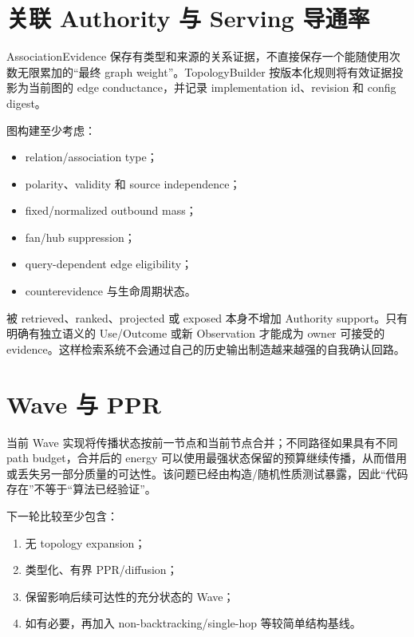 \section{关联 Authority 与 Serving 导通率}

AssociationEvidence 保存有类型和来源的关系证据，不直接保存一个能随使用次数无限累加的“最终 graph weight”。TopologyBuilder 按版本化规则将有效证据投影为当前图的 edge conductance，并记录 implementation id、revision 和 config digest。

图构建至少考虑：

\begin{itemize}
\item relation/association type；
\item polarity、validity 和 source independence；
\item fixed/normalized outbound mass；
\item fan/hub suppression；
\item query-dependent edge eligibility；
\item counterevidence 与生命周期状态。
\end{itemize}

被 retrieved、ranked、projected 或 exposed 本身不增加 Authority support。只有明确有独立语义的 Use/Outcome 或新 Observation 才能成为 owner 可接受的 evidence。这样检索系统不会通过自己的历史输出制造越来越强的自我确认回路。\cite{anderson1983,nous-research-package}

\section{Wave 与 PPR}

当前 Wave 实现将传播状态按前一节点和当前节点合并；不同路径如果具有不同 path budget，合并后的 energy 可以使用最强状态保留的预算继续传播，从而借用或丢失另一部分质量的可达性。该问题已经由构造/随机性质测试暴露，因此“代码存在”不等于“算法已经验证”。\cite{nous-code-snapshot,nous-research-package}

下一轮比较至少包含：

\begin{enumerate}
\item 无 topology expansion；
\item 类型化、有界 PPR/diffusion；
\item 保留影响后续可达性的充分状态的 Wave；
\item 如有必要，再加入 non-backtracking/single-hop 等较简单结构基线。
\end{enumerate}

